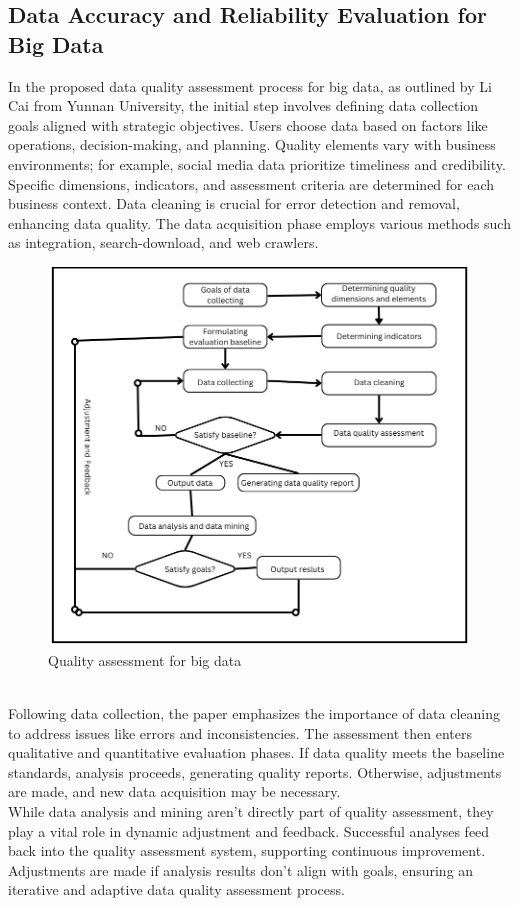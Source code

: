 \documentclass[10pt,a4paper]{article}
\begin{document}
\subsection{Data Accuracy and Reliability Evaluation for Big Data}
In the proposed data quality assessment process for big data, as outlined by Li Cai from Yunnan University, the initial step involves defining data collection goals aligned with strategic objectives. Users choose data based on factors like operations, decision-making, and planning. Quality elements vary with business environments; for example, social media data prioritize timeliness and credibility.
\\Specific dimensions, indicators, and assessment criteria are determined for each business context. Data cleaning is crucial for error detection and removal, enhancing data quality. The data acquisition phase employs various methods such as integration, search-download, and web crawlers.
\begin{figure}[htbp]
  \centering
  \includegraphics[width=0.8\columnwidth]{Quality assesment process for Big Data.png}
  \caption{Quality assessment for big data}
  \label{fig:quality-assessment}
\end{figure}
\\ 
Following data collection, the paper emphasizes the importance of data cleaning to address issues like errors and inconsistencies. The assessment then enters qualitative and quantitative evaluation phases. If data quality meets the baseline standards, analysis proceeds, generating quality reports. Otherwise, adjustments are made, and new data acquisition may be necessary.
\\
While data analysis and mining aren't directly part of quality assessment, they play a vital role in dynamic adjustment and feedback. Successful analyses feed back into the quality assessment system, supporting continuous improvement. Adjustments are made if analysis results don't align with goals, ensuring an iterative and adaptive data quality assessment process.\cite{article}
\end{document}
